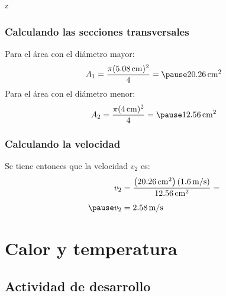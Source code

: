 z\documentclass[14pt]{beamer}
\begin{document}
\begin{frame}
\frametitle{Calculando las secciones transversales}
Para el área con el diámetro mayor:
\pause
\begin{eqnarray*}
\begin{aligned}
A_{1} = \dfrac{\pi (\SI{5.08}{\centi\meter})^{2}}{4} = \pause \SI{20.26}{\square\centi\meter}
\end{aligned}
\end{eqnarray*}
\pause
Para el área con el diámetro menor:
\pause
\begin{eqnarray*}
\begin{aligned}
A_{2} = \dfrac{\pi (\SI{4}{\centi\meter})^{2}}{4} = \pause \SI{12.56}{\square\centi\meter}
\end{aligned}
\end{eqnarray*}
\end{frame}
\begin{frame}
\frametitle{Calculando la velocidad}
Se tiene entonces que la velocidad $v_{2}$ es:
\pause
\begin{eqnarray*}
\begin{aligned}
v_{2} &= \dfrac{\left( \SI{20.26}{\square\centi\meter}\right) \left( \SI[per-mode=symbol]{1.6}{\meter\per\second}\right)}{\SI{12.56}{\square\centi\meter}} = \\[0.5em] \pause
v_{2} &= \SI[per-mode=symbol]{2.58}{\meter\per\second}
\end{aligned}
\end{eqnarray*}
\end{frame}

\section{Calor y temperatura}
\subsection{Actividad de desarrollo}
\end{document}
